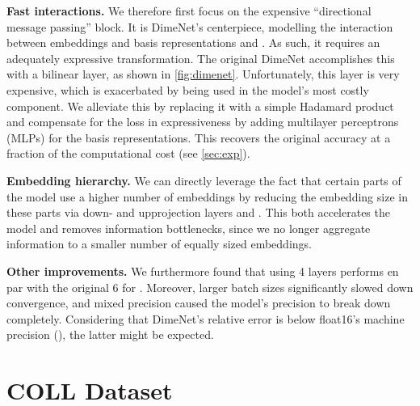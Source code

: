 \documentclass{article}
\begin{document}
\textbf{Fast interactions.} We therefore first focus on the expensive ``directional message passing'' block. It is DimeNet's centerpiece, modelling the interaction between embeddings  and basis representations  and . As such, it requires an adequately expressive transformation. The original DimeNet accomplishes this with a bilinear layer, as shown in \cref{fig:dimenet}. Unfortunately, this layer is very expensive, which is exacerbated by being used in the model's most costly component. We alleviate this by replacing it with a simple Hadamard product and compensate for the loss in expressiveness by adding multilayer perceptrons (MLPs) for the basis representations. This recovers the original accuracy at a fraction of the computational cost (see \cref{sec:exp}).

\textbf{Embedding hierarchy.} We can directly leverage the fact that certain parts of the model use a higher number of embeddings by reducing the embedding size in these parts via down- and upprojection layers  and . This both accelerates the model and removes information bottlenecks, since we no longer aggregate information to a smaller number of equally sized embeddings.

\textbf{Other improvements.} We furthermore found that using 4 layers performs en par with the original 6 for . Moreover, larger batch sizes significantly slowed down convergence, and mixed precision caused the model's precision to break down completely. Considering that DimeNet's relative error is below float16's machine precision (), the latter might be expected.

\section{\textsc{COLL} Dataset}
\end{document}
